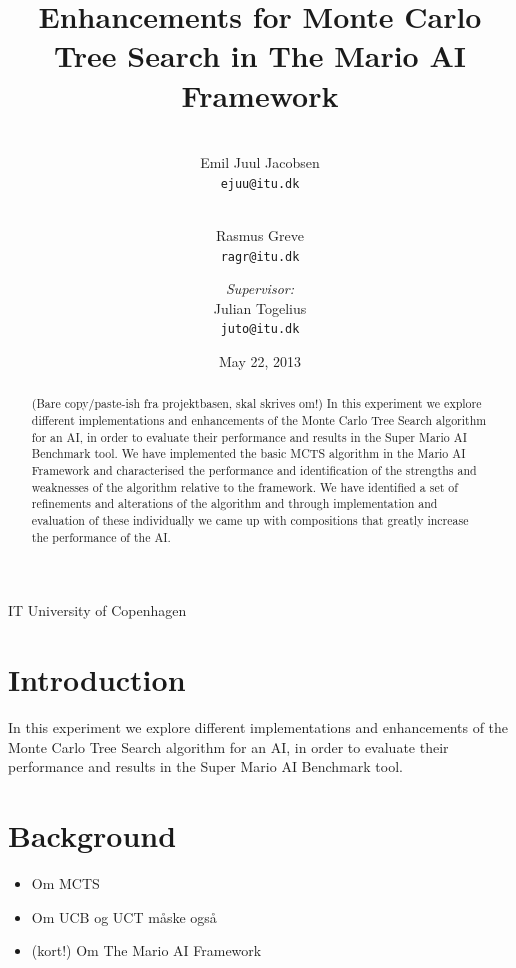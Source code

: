 \documentclass[10pt,a4paper,twoside]{article}
\begin{document}
\title{Enhancements for Monte Carlo Tree Search in The Mario AI Framework}
\date{May 22, 2013}
\author{\\Emil Juul Jacobsen\\\texttt{ejuu@itu.dk}        
        \and \\Rasmus Greve\\\texttt{ragr@itu.dk}
        \and \emph{Supervisor:}\\Julian Togelius\\\texttt{juto@itu.dk}}
\maketitle

\begin{center}
IT University of Copenhagen
\end{center}

\begin{abstract}
(Bare copy/paste-ish fra projektbasen, skal skrives om!)
In this experiment we explore different implementations and enhancements of the Monte Carlo Tree Search algorithm for an AI, in order to evaluate their performance and results in the Super Mario AI Benchmark tool. 
We have implemented the basic MCTS algorithm in the Mario AI 
Framework and characterised the performance and identification of 
the strengths and weaknesses of the algorithm relative to the 
framework. We have identified a set of refinements and alterations of the algorithm 
and through implementation and evaluation of these individually we came up
with compositions that greatly increase the performance of the AI.
\end{abstract}

\pagebreak

\section{Introduction}
In this experiment we explore different implementations and enhancements of the Monte Carlo Tree Search algorithm for an AI, in order to evaluate their performance and results in the Super Mario AI Benchmark tool. 

\section{Background}
\begin{itemize}
\item Om MCTS \cite{mctssurvey}
\item Om UCB og UCT \cite{mctssurvey} måske også \cite{mspacman}
\item (kort!) Om The Mario AI Framework  \cite{mario}
\end{itemize}
\end{document}
